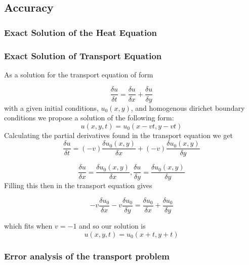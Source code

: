 \subsection{Accuracy}
\subsubsection{Exact Solution of the Heat Equation}



\subsubsection{Exact Solution of Transport Equation}
As a solution for the transport equation of form

\begin{equation}
\frac{\delta u}{\delta t} = \frac{\delta u}{\delta x} + \frac{\delta u}{\delta y}
\end{equation}
with a given initial conditions, $u_0(x,y)$, and homogenous dirichet boundary conditions we propose a solution of the following form:
\begin{equation}
u(x,y,t) = u_0(x-vt,y-vt)
\label{proposal}
\end{equation}
Calculating the partial derivatives found in the transport equation we get
\begin{equation}
\frac{\delta u}{\delta t} =(-v) \frac{\delta u_0(x,y)}{\delta x} +(-v) \frac{\delta u_0(x,y)}{\delta y} 
\end{equation}

\begin{equation}
\frac{\delta u}{\delta x} = \frac{\delta u_0(x,y)}{\delta x} ,\frac{\delta u}{\delta y} = \frac{\delta u_0(x,y)}{\delta y} 
\end{equation}
Filling this then in the transport equation gives

\begin{equation}
-v\frac{\delta u_0}{\delta x}-v\frac{\delta u_0}{\delta y} = \frac{\delta u_0}{\delta x}+\frac{\delta u_0}{\delta y} 
\end{equation}

which fits when $v=-1$ and so our solution is
\begin{equation}
u(x,y,t)=u_0(x+t,y+t)
\end{equation}

\subsubsection{Error analysis of the transport problem}

